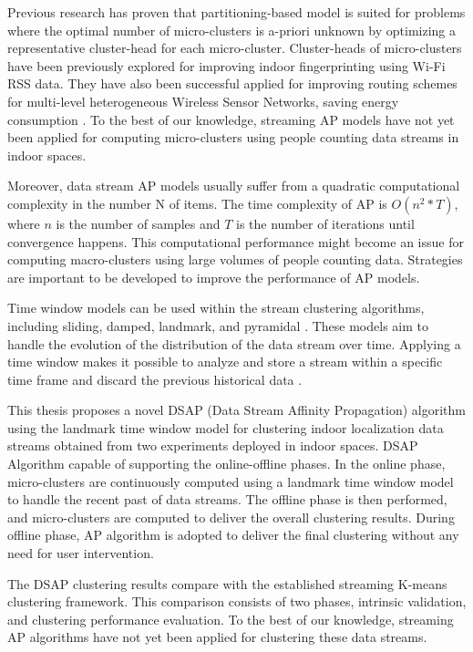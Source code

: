 Previous research has proven that partitioning-based model is suited for problems where the optimal number of micro-clusters is a-priori unknown by optimizing a representative cluster-head for each micro-cluster. Cluster-heads of micro-clusters have been previously explored for improving indoor fingerprinting using Wi-Fi RSS data\cite{hu2015improving, subedi2019improving}. They have also been successful applied for improving routing schemes for multi-level heterogeneous Wireless Sensor Networks, saving energy consumption \cite{wang2019affinity}. To the best of our knowledge,  streaming AP models have not yet been applied for computing micro-clusters using people counting data streams in indoor spaces.  

Moreover, data stream AP models usually suffer from a quadratic computational complexity in the number N of items. The time complexity of AP is $O(n^2*T)$, where $n$ is the number of samples and $T$ is the number of iterations until convergence happens\cite{refianti2017time}. This computational performance might become an issue for computing macro-clusters using large volumes of people counting data. Strategies are important to be developed to improve the performance of AP models. 

Time window models can be used within the stream clustering algorithms, including sliding, damped, landmark, and pyramidal \cite{nguyen2015survey}. These models aim to handle the evolution of the distribution of the data stream over time. Applying a time window makes it possible to analyze and store a stream within a specific time frame and discard the previous historical data \cite{mansalis2018evaluation}.

This thesis proposes a novel DSAP (Data Stream Affinity Propagation) algorithm using the landmark time window model for clustering indoor localization data streams obtained from two experiments deployed in indoor spaces. DSAP Algorithm capable of supporting the online-offline phases. In the online phase, micro-clusters are continuously computed using a landmark time window model to handle the recent past of data streams. The offline phase is then performed, and micro-clusters are computed to deliver the overall clustering results. During offline phase, AP algorithm is adopted to deliver the final clustering without any need for user intervention.

The DSAP clustering results compare with the established streaming K-means clustering framework. This comparison consists of two phases, intrinsic validation, and clustering performance evaluation.
To the best of our knowledge, streaming AP algorithms have not yet been applied for clustering these data streams. 

